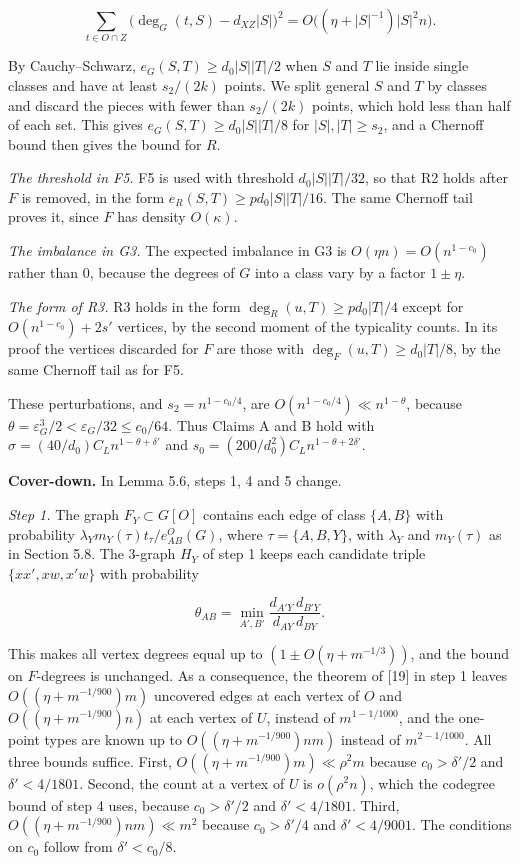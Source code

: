 \documentclass[english,11pt,a4paper]{article}
\begin{document}
\nopagebreak[4]
\[\sum_{t\in O\cap Z}\bigl(\deg_G(t,S)-d_{XZ}|S|\bigr)^2=O\bigl((\eta+|S|^{-1})|S|^2n\bigr).\]

By Cauchy--Schwarz, \(e_G(S,T)\ge d_0|S||T|/2\) when \(S\) and \(T\) lie inside single classes and have at least \(s_2/(2k)\) points. We split general \(S\) and \(T\) by classes and discard the pieces with fewer than \(s_2/(2k)\) points, which hold less than half of each set. This gives \(e_G(S,T)\ge d_0|S||T|/8\) for \(|S|,|T|\ge s_2\), and a Chernoff bound then gives the bound for \(R\).

\emph{The threshold in F5.} F5 is used with threshold \(d_0|S||T|/32\), so that R2 holds after \(F\) is removed, in the form \(e_R(S,T)\ge pd_0|S||T|/16\). The same Chernoff tail proves it, since \(F\) has density \(O(\kappa)\).

\emph{The imbalance in G3.} The expected imbalance in G3 is \(O(\eta n)=O(n^{1-c_0})\) rather than \(0\), because the degrees of \(G\) into a class vary by a factor \(1\pm\eta\).

\emph{The form of R3.} R3 holds in the form \(\deg_R(u,T)\ge pd_0|T|/4\) except for \(O(n^{1-c_0})+2s'\) vertices, by the second moment of the typicality counts. In its proof the vertices discarded for \(F\) are those with \(\deg_F(u,T)\ge d_0|T|/8\), by the same Chernoff tail as for F5.

These perturbations, and \(s_2=n^{1-c_0/4}\), are \(O(n^{1-c_0/4})\ll n^{1-\theta}\), because \(\theta=\varepsilon_G^3/2<\varepsilon_G/32\le c_0/64\). Thus Claims A and B hold with \(\sigma=(40/d_0)C_Ln^{1-\theta+\delta'}\) and \(s_0=(200/d_0^2)C_Ln^{1-\theta+2\delta'}\).

\textbf{Cover-down.} In Lemma 5.6, steps 1, 4 and 5 change.

\emph{Step 1.} The graph \(F_Y\subset G[O]\) contains each edge of class \(\{A,B\}\) with probability \(\lambda_Y m_Y(\tau)t_\tau/e^O_{AB}(G)\), where \(\tau=\{A,B,Y\}\), with \(\lambda_Y\) and \(m_Y(\tau)\) as in Section 5.8. The 3-graph \(H_Y\) of step 1 keeps each candidate triple \(\{xx',xw,x'w\}\) with probability

\nopagebreak[4]
\[\theta_{AB}=\min_{A',B'}\frac{d_{A'Y}\,d_{B'Y}}{d_{AY}\,d_{BY}}.\]

This makes all vertex degrees equal up to \((1\pm O(\eta+m^{-1/3}))\), and the bound on \(F\)-degrees is unchanged. As a consequence, the theorem of {[}19{]} in step 1 leaves \(O((\eta+m^{-1/900})m)\) uncovered edges at each vertex of \(O\) and \(O((\eta+m^{-1/900})n)\) at each vertex of \(U\), instead of \(m^{1-1/1000}\), and the one-point types are known up to \(O((\eta+m^{-1/900})nm)\) instead of \(m^{2-1/1000}\). All three bounds suffice. First, \(O((\eta+m^{-1/900})m)\ll\rho^2m\) because \(c_0>\delta'/2\) and \(\delta'<4/1801\). Second, the count at a vertex of \(U\) is \(o(\rho^2n)\), which the codegree bound of step 4 uses, because \(c_0>\delta'/2\) and \(\delta'<4/1801\). Third, \(O((\eta+m^{-1/900})nm)\ll m^2\) because \(c_0>\delta'/4\) and \(\delta'<4/9001\). The conditions on \(c_0\) follow from \(\delta'<c_0/8\).
\end{document}
